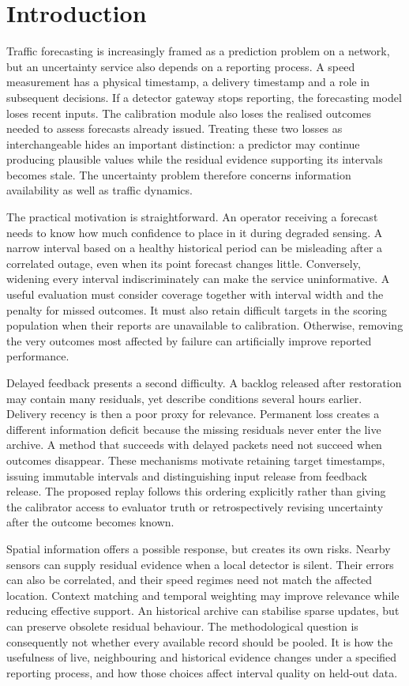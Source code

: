 \section{Introduction}\label{sec:introduction}
Traffic forecasting is increasingly framed as a prediction problem on a network, but an uncertainty service also depends on a reporting process. A speed measurement has a physical timestamp, a delivery timestamp and a role in subsequent decisions. If a detector gateway stops reporting, the forecasting model loses recent inputs. The calibration module also loses the realised outcomes needed to assess forecasts already issued. Treating these two losses as interchangeable hides an important distinction: a predictor may continue producing plausible values while the residual evidence supporting its intervals becomes stale. The uncertainty problem therefore concerns information availability as well as traffic dynamics.

The practical motivation is straightforward. An operator receiving a forecast needs to know how much confidence to place in it during degraded sensing. A narrow interval based on a healthy historical period can be misleading after a correlated outage, even when its point forecast changes little. Conversely, widening every interval indiscriminately can make the service uninformative. A useful evaluation must consider coverage together with interval width and the penalty for missed outcomes. It must also retain difficult targets in the scoring population when their reports are unavailable to calibration. Otherwise, removing the very outcomes most affected by failure can artificially improve reported performance.

Delayed feedback presents a second difficulty. A backlog released after restoration may contain many residuals, yet describe conditions several hours earlier. Delivery recency is then a poor proxy for relevance. Permanent loss creates a different information deficit because the missing residuals never enter the live archive. A method that succeeds with delayed packets need not succeed when outcomes disappear. These mechanisms motivate retaining target timestamps, issuing immutable intervals and distinguishing input release from feedback release. The proposed replay follows this ordering explicitly rather than giving the calibrator access to evaluator truth or retrospectively revising uncertainty after the outcome becomes known.

Spatial information offers a possible response, but creates its own risks. Nearby sensors can supply residual evidence when a local detector is silent. Their errors can also be correlated, and their speed regimes need not match the affected location. Context matching and temporal weighting may improve relevance while reducing effective support. An historical archive can stabilise sparse updates, but can preserve obsolete residual behaviour. The methodological question is consequently not whether every available record should be pooled. It is how the usefulness of live, neighbouring and historical evidence changes under a specified reporting process, and how those choices affect interval quality on held-out data.

